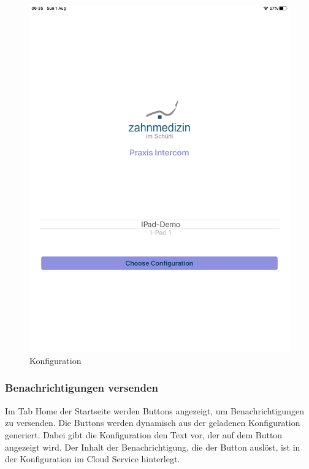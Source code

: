 \begin{figure}[h]
\begin{minipage}[b]{0.4\textwidth}
        \includegraphics[width=\textwidth]{graphics/screenshots/mobileclient/screenshot-select-config}
        \caption{Konfiguration}
    \end{minipage}
    \label{fig:MobileClient-Screens1}
\end{figure}

\clearpage

\subsubsection*{Benachrichtigungen versenden}

Im Tab Home der Startseite werden Buttons angezeigt, um Benachrichtigungen zu versenden.
Die Buttons werden dynamisch aus der geladenen Konfiguration generiert.
Dabei gibt die Konfiguration den Text vor, der auf dem Button angezeigt wird.
Der Inhalt der Benachrichtigung, die der Button auslöst, ist in der Konfiguration im Cloud Service hinterlegt.

